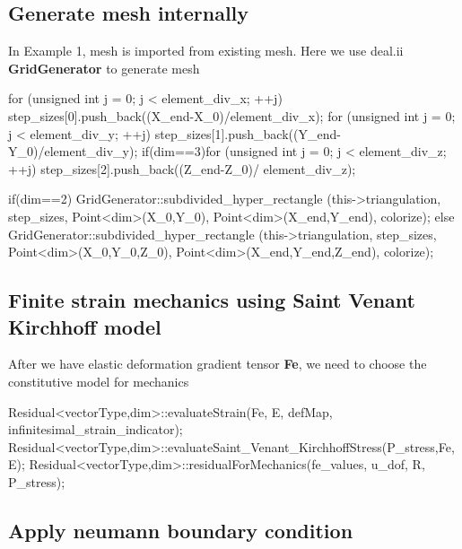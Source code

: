 \hypertarget{battery_electrode_scale_Generate}{}\subsection{Generate mesh internally}\label{battery_electrode_scale_Generate}
In Example 1, mesh is imported from existing mesh. Here we use deal.\-ii {\bfseries Grid\-Generator} to generate mesh 
\begin{DoxyCode}
\textcolor{keywordflow}{for} (\textcolor{keywordtype}{unsigned} \textcolor{keywordtype}{int} j = 0; j < element\_div\_x; ++j) step\_sizes[0].push\_back((X\_end-X\_0)/element\_div\_x); 
\textcolor{keywordflow}{for} (\textcolor{keywordtype}{unsigned} \textcolor{keywordtype}{int} j = 0; j < element\_div\_y; ++j) step\_sizes[1].push\_back((Y\_end-Y\_0)/element\_div\_y);
\textcolor{keywordflow}{if}(dim==3)\textcolor{keywordflow}{for} (\textcolor{keywordtype}{unsigned} \textcolor{keywordtype}{int} j = 0; j < element\_div\_z; ++j) step\_sizes[2].push\_back((Z\_end-Z\_0)/
      element\_div\_z);

\textcolor{keywordflow}{if}(dim==2) GridGenerator::subdivided\_hyper\_rectangle (this->triangulation, step\_sizes, Point<dim>(X\_0,Y\_0),
       Point<dim>(X\_end,Y\_end), colorize);
\textcolor{keywordflow}{else} GridGenerator::subdivided\_hyper\_rectangle (this->triangulation, step\_sizes, Point<dim>(X\_0,Y\_0,Z\_0), 
      Point<dim>(X\_end,Y\_end,Z\_end), colorize);
\end{DoxyCode}
\hypertarget{battery_electrode_scale_Finite}{}\subsection{Finite strain mechanics using Saint Venant Kirchhoff model}\label{battery_electrode_scale_Finite}
After we have elastic deformation gradient tensor {\bfseries Fe}, we need to choose the constitutive model for mechanics 
\begin{DoxyCode}
Residual<vectorType,dim>::evaluateStrain(Fe, E, defMap, infinitesimal\_strain\_indicator);
Residual<vectorType,dim>::evaluateSaint_Venant_KirchhoffStress(P\_stress,Fe, E);
Residual<vectorType,dim>::residualForMechanics(fe\_values, u\_dof, R, P\_stress);  
\end{DoxyCode}
\hypertarget{battery_electrode_scale_neumann}{}\subsection{Apply neumann boundary condition}\label{battery_electrode_scale_neumann}
